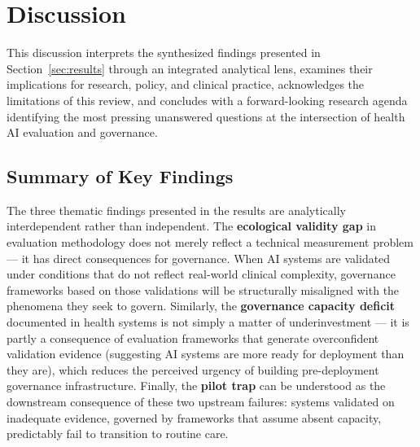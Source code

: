 
\section{Discussion}
\label{sec:discussion}

This discussion interprets the synthesized findings presented in
Section~\ref{sec:results} through an integrated analytical lens, examines
their implications for research, policy, and clinical practice, acknowledges
the limitations of this review, and concludes with a forward-looking
research agenda identifying the most pressing unanswered questions at the
intersection of health AI evaluation and governance.

\subsection{Summary of Key Findings}
\label{sec:discussion_summary}

The three thematic findings presented in the results are analytically
interdependent rather than independent. The \textbf{ecological validity
gap} in evaluation methodology does not merely reflect a technical
measurement problem — it has direct consequences for governance. When AI
systems are validated under conditions that do not reflect real-world
clinical complexity, governance frameworks based on those validations
will be structurally misaligned with the phenomena they seek to govern.
Similarly, the \textbf{governance capacity deficit} documented in health
systems is not simply a matter of underinvestment — it is partly a
consequence of evaluation frameworks that generate overconfident
validation evidence (suggesting AI systems are more ready for deployment
than they are), which reduces the perceived urgency of building
pre-deployment governance infrastructure. Finally, the \textbf{pilot
trap} can be understood as the downstream consequence of these two
upstream failures: systems validated on inadequate evidence, governed
by frameworks that assume absent capacity, predictably fail to transition
to routine care.

